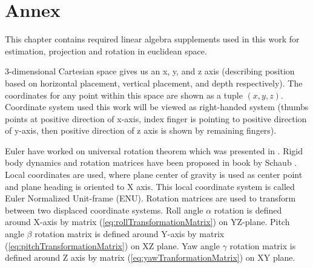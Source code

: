 \chapter*{Annex}\noindent
\noindent This chapter contains required linear algebra supplements used in this work for estimation, projection and rotation in euclidean space. 

3-dimensional Cartesian space gives us an x, y, and z axis (describing position based on horizontal placement, vertical placement, and depth respectively). The coordinates for any point within this space are shown as a tuple $(x,y,z)$. Coordinate system used this work will be viewed as right-handed system (thumbs points at positive direction of x-axis, index finger is pointing to positive direction of y-axis, then positive  direction of z axis is shown by remaining fingers).

Euler have worked on universal rotation theorem which was presented in \cite{euler1775formulae}. Rigid body dynamics and rotation matrices have been proposed in book by Schaub \cite{schaub2003analytical}. Local coordinates are used, where plane center of gravity is used as center point and plane heading is oriented to X axis. This local coordinate system is called Euler Normalized Unit-frame (ENU). Rotation matrices are used to transform between two displaced coordinate systems. Roll angle $\alpha$ rotation is defined around X-axis by matrix (\ref{eq:rollTransformationMatrix}) on YZ-plane. Pitch angle $\beta$ rotation matrix is defined around Y-axis by matrix (\ref{eq:pitchTransformationMatrix}) on XZ plane. Yaw angle $\gamma$ rotation matrix is defined around Z axis by matrix (\ref{eq:yawTranformationMatrix}) on XY plane.

